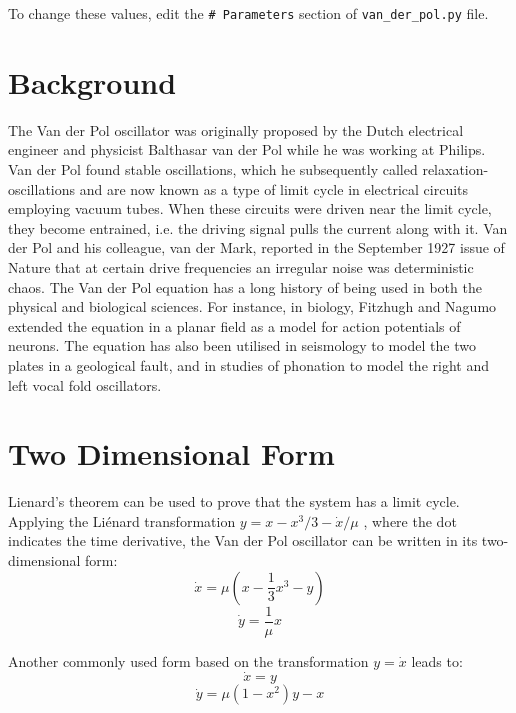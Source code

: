 \documentclass[12pt, a4paper]{article}
\begin{document}
To change these values, edit the \texttt{\# Parameters} section of \texttt{van\_der\_pol.py} file.

\section{Background}
The Van der Pol oscillator was originally proposed by the Dutch electrical engineer and physicist Balthasar van der Pol while he was working at Philips.\cite{wiki:1} Van der Pol found stable oscillations, which he subsequently called relaxation-oscillations\cite{wiki:3} and are now known as a type of limit cycle in electrical circuits employing vacuum tubes. When these circuits were driven near the limit cycle, they become entrained, i.e. the driving signal pulls the current along with it. Van der Pol and his colleague, van der Mark, reported in the September 1927 issue of Nature that at certain drive frequencies an irregular noise was deterministic chaos.\cite{wiki:5}
The Van der Pol equation has a long history of being used in both the physical and biological sciences. For instance, in biology, Fitzhugh and Nagumo extended the equation in a planar field as a model for action potentials of neurons. The equation has also been utilised in seismology to model the two plates in a geological fault, and in studies of phonation to model the right and left vocal fold oscillators.

\section{Two Dimensional Form}
Lienard's theorem can be used to prove that the system has a limit cycle. Applying the Liénard transformation $y = x- x^3/3 - \dot{x}/\mu$ , where the dot indicates the time derivative, the Van der Pol oscillator can be written in its two-dimensional form:
\begin{equation} \label{2dformx}
\dot{x} = \mu\left(x - \frac{1}{3}x^3 - y \right)
\end{equation}
\begin{equation} \label{2dformy}
\dot{y} = \frac{1}{\mu}x
\end{equation}

Another commonly used form based on the transformation $ y = \dot{x} $ leads to:
\begin{equation} \label{2dform2x}
\dot{x} = y
\end{equation}
\begin{equation} \label{2dform2x}
\dot{y} = \mu(1-x^2)y - x
\end{equation}
\end{document}
